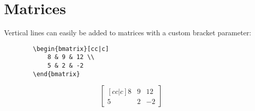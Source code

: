 \documentclass[11pt,a4paper]{article}
\begin{document}
\todo

\section{Matrices}
Vertical lines can easily be added to matrices with a custom bracket parameter:

\begin{minipage}{0.5\textwidth}
    \begin{verbatim}
        \begin{bmatrix}[cc|c]
            8 & 9 & 12 \\
            5 & 2 & -2
        \end{bmatrix}
    \end{verbatim}
\end{minipage}%
\hfill
\begin{minipage}{0.5\textwidth}
    \begin{equation*}
        \begin{bmatrix}[cc|c]
            8 & 9 & 12 \\
            5 & 2 & -2
        \end{bmatrix}
    \end{equation*}
\end{minipage}
\end{document}
